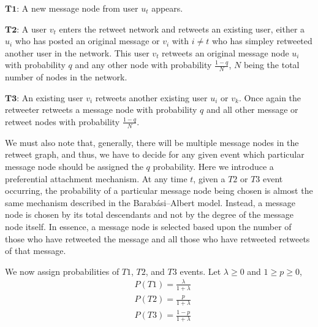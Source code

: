 \vspace{3mm}
$\pmb{T1}$: A new message node from user $u_t$ appears.

\vspace{3mm}
$\pmb{T2}$: A user $v_t$ enters the retweet network and retweets an existing user, either a $u_i$ who has posted an original message or $v_i$ with $i \neq t$ who
has simpley retweeted another user in the network. This user $v_t$ retweets an original message node $u_i$ with 
probability $q$ and any other node with probability $\frac{1-q}{N}$, $N$ being the total number of nodes in the network.

\vspace{3mm}
$\pmb{T3}$: An existing user $v_i$ retweets another existing user $u_i$ or $v_k$. Once again the retweeter retweets a message node with probability 
$q$ and all other message or retweet nodes with probability $\frac{1-q}{N}$.

We must also note that, generally, there will be multiple message nodes in the retweet graph, and thus,
 we have to decide for any given event
which particular message node should be assigned the $q$ probability.
 Here we introduce a preferential attachment mechanism. At any time $t$,
given a $T2$ or $T3$ event occurring, the probability of a particular message node being chosen is almost the
same mechanism described in the Barabási–Albert model. Instead, a message node is chosen
by its total descendants and not by the degree of the message node itself. In essence, a message node
is selected based upon the number of those who have retweeted the message and all those who have retweeted
retweets of that message.


We now assign probabilities of $T1$, $T2$, and $T3$ events. Let $\lambda \geq 0$ and $1 \geq p \geq 0$,
\begin{align*}
    &P(T1) = \frac{\lambda}{1 + \lambda} \\
    &P(T2) = \frac{p}{1 + \lambda} \\
    &P(T3) = \frac{1-p}{1 + \lambda} \\
\end{align*}


